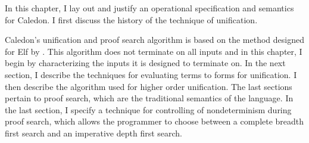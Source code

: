 In this chapter, I lay out and justify an operational specification and semantics 
for Caledon.  I first discuss the history of the technique of unification.

Caledon's unification and proof search algorithm is based on the method designed for Elf by
\citet{pfenning1991logic}.  This algorithm does not terminate on all inputs and in this chapter, 
I begin by characterizing the inputs it is designed to terminate on.  In the next section, I describe
the techniques for evaluating terms to forms for unification.  I then describe the algorithm
used for higher order unification.  
The last sections pertain to proof search, which are the traditional semantics of the language.
In the last section, I specify a technique for controlling of nondeterminism during proof search, 
which allows the programmer to choose between a complete breadth first search and an imperative depth first search.
